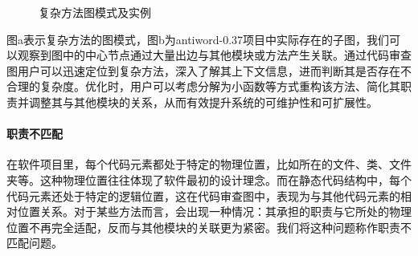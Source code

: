 \begin{figure}[!h]
    \setlength{\subfigcapskip}{-1bp}
    \centering
    \begin{minipage}{\textwidth}
    \centering
    \hspace{2em}
    \end{minipage}
    \vspace{0.2em}
    \caption{复杂方法图模式及实例} %
\end{figure}

图a表示复杂方法的图模式，图b为antiword-0.37项目中实际存在的子图，我们可以观察到图中的中心节点通过大量出边与其他模块或方法产生关联。通过代码审查图用户可以迅速定位到复杂方法，深入了解其上下文信息，进而判断其是否存在不合理的复杂度。优化时，用户可以考虑分解为小函数等方式重构该方法、简化其职责并调整其与其他模块的关系，从而有效提升系统的可维护性和可扩展性。


\paragraph{职责不匹配} 在软件项目里，每个代码元素都处于特定的物理位置，比如所在的文件、类、文件夹等。这种物理位置往往体现了软件最初的设计理念。而在静态代码结构中，每个代码元素还处于特定的逻辑位置，这在代码审查图中，表现为与其他代码元素的相对位置关系。对于某些方法而言，会出现一种情况：其承担的职责与它所处的物理位置不再完全适配，反而与其他模块的关联更为紧密。我们将这种问题称作职责不匹配问题。


